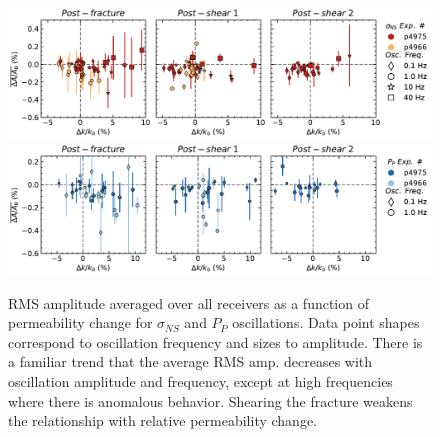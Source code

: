 \documentclass[letterpaper,10pt]{article}
\begin{document}
	
	\begin{figure}[ht]
		\centering
		\includegraphics[width=1\columnwidth]{avg_DelA_perm_NS}
		\includegraphics[width=1\columnwidth]{avg_DelA_perm_PP}
		\caption{RMS amplitude averaged over all receivers as a function of permeability change for $ \sigma_{NS} $ and $ P_P $ oscillations. Data point shapes correspond to oscillation frequency and sizes to amplitude. There is a familiar trend that the average RMS amp. decreases with oscillation amplitude and frequency, except at high frequencies where there is anomalous behavior. Shearing the fracture weakens the relationship with relative permeability change.}
		\label{fig:dela_plots2}
	\end{figure}
	
	\clearpage
	
	
	
	
\end{document}
